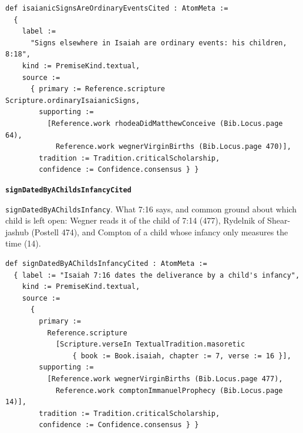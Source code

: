 \documentclass[11pt]{article}
\begin{document}
{\small\begin{verbatim}
def isaianicSignsAreOrdinaryEventsCited : AtomMeta :=
  {
    label :=
      "Signs elsewhere in Isaiah are ordinary events: his children, 8:18",
    kind := PremiseKind.textual,
    source :=
      { primary := Reference.scripture Scripture.ordinaryIsaianicSigns,
        supporting :=
          [Reference.work rhodeaDidMatthewConceive (Bib.Locus.page 64),
            Reference.work wegnerVirginBirths (Bib.Locus.page 470)],
        tradition := Tradition.criticalScholarship,
        confidence := Confidence.consensus } }
\end{verbatim}}
\par\medskip\noindent\textbf{\texttt{sign\allowbreak{}Dated\allowbreak{}By\allowbreak{}AChilds\allowbreak{}Infancy\allowbreak{}Cited}}\par\nobreak\noindent
\texttt{sign\allowbreak{}Dated\allowbreak{}By\allowbreak{}AChilds\allowbreak{}Infancy}. What 7:16 says, and common ground about which child is left open: Wegner reads it of the child of 7:14 (477), Rydelnik of Shear-jashub (Postell 474), and Compton of a child whose infancy only measures the time (14).

{\small\begin{verbatim}
def signDatedByAChildsInfancyCited : AtomMeta :=
  { label := "Isaiah 7:16 dates the deliverance by a child's infancy",
    kind := PremiseKind.textual,
    source :=
      {
        primary :=
          Reference.scripture
            [Scripture.verseIn TextualTradition.masoretic
                { book := Book.isaiah, chapter := 7, verse := 16 }],
        supporting :=
          [Reference.work wegnerVirginBirths (Bib.Locus.page 477),
            Reference.work comptonImmanuelProphecy (Bib.Locus.page 14)],
        tradition := Tradition.criticalScholarship,
        confidence := Confidence.consensus } }
\end{verbatim}}



\end{document}
